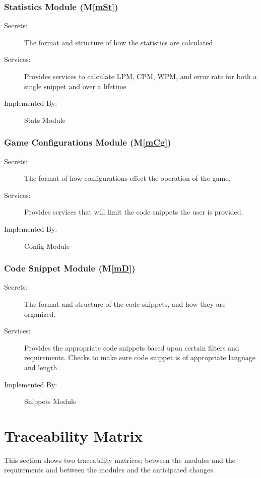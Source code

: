 \documentclass[12pt, titlepage]{article}
\newcommand{\mref}[1]{M\ref{#1}}
\begin{document}
\subsubsection{Statistics Module (\mref{mSt})}

\begin{description}
\item[Secrets:] The format and structure of how the statistics are calculated
\item[Services:] Provides services to calculate LPM, CPM, WPM, and error rate for both a single snippet and over a lifetime
\item[Implemented By:] Stats Module
\end{description}

\subsubsection{Game Configurations Module (\mref{mCg})}

\begin{description}
\item[Secrets:]The format of how configurations effect the operation of the game.
\item[Services:] Provides services that will limit the code snippets the user is provided.
\item[Implemented By:] Config Module
\end{description}

\subsubsection{Code Snippet Module (\mref{mD})}

\begin{description}
\item[Secrets:] The format and structure of the code snippets, and how they are organized.
\item[Services:] Provides the appropriate code snippets based upon certain filters and requirements. Checks to make sure code snippet is of appropriate language and length.
\item[Implemented By:] Snippets Module
\end{description}

\section{Traceability Matrix} \label{SecTM}

This section shows two traceability matrices: between the modules and the
requirements and between the modules and the anticipated changes.
\end{document}
